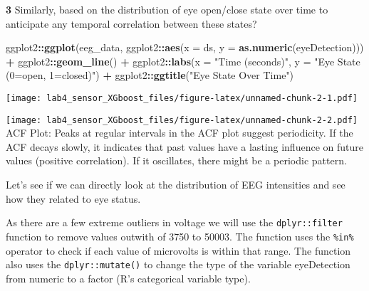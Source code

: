 \documentclass[
]{article}
\newenvironment{Shaded}{\begin{snugshade}}{\end{snugshade}}
\newcommand{\AttributeTok}[1]{\textcolor[rgb]{0.13,0.29,0.53}{#1}}
\newcommand{\CommentTok}[1]{\textcolor[rgb]{0.56,0.35,0.01}{\textit{#1}}}
\newcommand{\ConstantTok}[1]{\textcolor[rgb]{0.56,0.35,0.01}{#1}}
\newcommand{\DecValTok}[1]{\textcolor[rgb]{0.00,0.00,0.81}{#1}}
\newcommand{\FunctionTok}[1]{\textcolor[rgb]{0.13,0.29,0.53}{\textbf{#1}}}
\newcommand{\NormalTok}[1]{#1}
\newcommand{\OtherTok}[1]{\textcolor[rgb]{0.56,0.35,0.01}{#1}}
\newcommand{\SpecialCharTok}[1]{\textcolor[rgb]{0.81,0.36,0.00}{\textbf{#1}}}
\newcommand{\StringTok}[1]{\textcolor[rgb]{0.31,0.60,0.02}{#1}}
\begin{document}
\textbf{3} Similarly, based on the distribution of eye open/close state
over time to anticipate any temporal correlation between these states?

\begin{Shaded}
\begin{Highlighting}[]
\NormalTok{ggplot2}\SpecialCharTok{::}\FunctionTok{ggplot}\NormalTok{(eeg\_data, ggplot2}\SpecialCharTok{::}\FunctionTok{aes}\NormalTok{(}\AttributeTok{x =}\NormalTok{ ds, }\AttributeTok{y =} \FunctionTok{as.numeric}\NormalTok{(eyeDetection))) }\SpecialCharTok{+} 
\NormalTok{  ggplot2}\SpecialCharTok{::}\FunctionTok{geom\_line}\NormalTok{() }\SpecialCharTok{+} 
\NormalTok{  ggplot2}\SpecialCharTok{::}\FunctionTok{labs}\NormalTok{(}\AttributeTok{x =} \StringTok{"Time (seconds)"}\NormalTok{, }\AttributeTok{y =} \StringTok{"Eye State (0=open, 1=closed)"}\NormalTok{) }\SpecialCharTok{+} 
\NormalTok{  ggplot2}\SpecialCharTok{::}\FunctionTok{ggtitle}\NormalTok{(}\StringTok{"Eye State Over Time"}\NormalTok{)}
\end{Highlighting}
\end{Shaded}

\texttt{[image: lab4\_sensor\_XGboost\_files/figure-latex/unnamed-chunk-2-1.pdf]}

\begin{Shaded}
\end{Shaded}

\texttt{[image: lab4\_sensor\_XGboost\_files/figure-latex/unnamed-chunk-2-2.pdf]}
ACF Plot: Peaks at regular intervals in the ACF plot suggest
periodicity. If the ACF decays slowly, it indicates that past values
have a lasting influence on future values (positive correlation). If it
oscillates, there might be a periodic pattern.

Let's see if we can directly look at the distribution of EEG intensities
and see how they related to eye status.

As there are a few extreme outliers in voltage we will use the
\texttt{dplyr::filter} function to remove values outwith of 3750 to
50003. The function uses the \texttt{\%in\%} operator to check if each
value of microvolts is within that range. The function also uses the
\texttt{dplyr::mutate()} to change the type of the variable eyeDetection
from numeric to a factor (R's categorical variable type).
\end{document}
